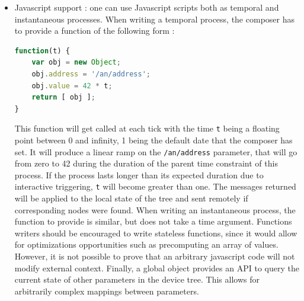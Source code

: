\documentclass{article}
\begin{document}
\begin{itemize}
\item Javascript support : one can use Javascript scripts both as temporal and instantaneous processes.
When writing a temporal process, the composer has to provide a function of the following form : 
\begin{lstlisting}[language=JavaScript]
function(t) {      
    var obj = new Object; 
    obj.address = '/an/address'; 
    obj.value = 42 * t; 
    return [ obj ];
}
\end{lstlisting}
This function will get called at each tick with the time \lstinline{t} being a floating point between 0 and infinity, 1 being the default date that the composer has set. 
It will produce a linear ramp on the \lstinline|/an/address| parameter, that will go from zero to 42 during the duration of the parent time constraint of this process.
If the process lasts longer than its expected duration due to interactive triggering, \lstinline|t| will become greater than one.
The messages returned will be applied to the local state of the tree and sent remotely if corresponding nodes were found.
When writing an instantaneous process, the function to provide is similar, but does not take a time argument.
Functions writers should be encouraged to write stateless functions, since it would allow for optimizations opportunities such as precomputing an array of values. 
However, it is not possible to prove that an arbitrary javascript code will not modify external context.
Finally, a global object provides an API to query the current state of other parameters in the device tree.
This allows for arbitrarily complex mappings between parameters.


\end{itemize}
\end{document}
